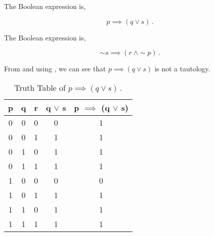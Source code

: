 \begin{subquestions}

\subquestion

\begin{subsubquestions}
	
\subsubquestion

The Boolean expression is,

\begin{equation}
	p \implies (q \lor s)\,.
\end{equation}


\subsubquestion

The Boolean expression is,

\begin{equation}
	\sim s \implies (r ~\land \sim p)\,.
\end{equation}


\subsubquestion

From  and using , we can see that $p \implies (q \lor s)$ is not a tautology.

\begin{table}[ht]
	\centering
	\begin{tabular}{|c|c|c|c|c|}
		\hline
		p & q & r & q $\lor$ s & p $\implies$ (q $\lor$ s) \\
		\hline
		0 & 0 & 0 & 0 & 1 \\
		0 & 0 & 1 & 1 & 1 \\
		0 & 1 & 0 & 1 & 1 \\
		0 & 1 & 1 & 1 & 1 \\
		1 & 0 & 0 & 0 & 0 \\
		1 & 0 & 1 & 1 & 1 \\
		1 & 1 & 0 & 1 & 1 \\
		1 & 1 & 1 & 1 & 1 \\
		\hline
	\end{tabular}
	\caption{\label{2016:q1:tab:TruthTab2} Truth Table of $p \implies (q \lor s)$\,.}
\end{table}

\end{subsubquestions}

\end{subquestions}

